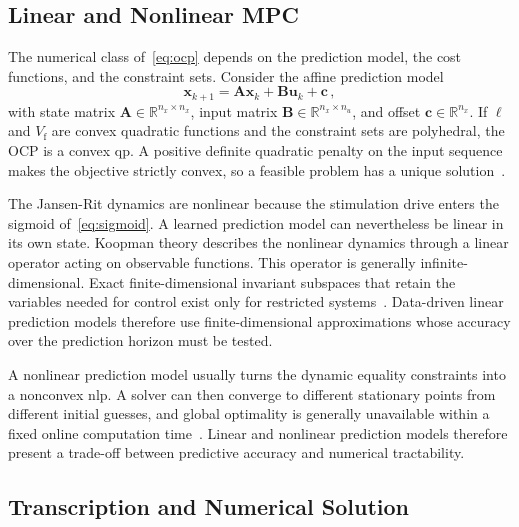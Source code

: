 \subsection{Linear and Nonlinear MPC}
\label{sec:linear_nonlinear_mpc}

The numerical class of~\eqref{eq:ocp} depends on the prediction model, the cost functions, %
and the constraint sets. Consider the affine prediction model
%
\begin{equation*}
    \mathbf{x}_{k+1} = \mathbf{A}\mathbf{x}_k + \mathbf{B}\mathbf{u}_k + \mathbf{c} \,,
\end{equation*}
%
with state matrix $\mathbf{A} \in \mathbb{R}^{n_x \times n_x}$, input matrix
$\mathbf{B} \in \mathbb{R}^{n_x \times n_u}$, and offset
$\mathbf{c} \in \mathbb{R}^{n_x}$. If $\ell$ and $V_\mathrm{f}$ are convex quadratic
functions and the constraint sets are polyhedral, the OCP is a convex \ac{qp}. A positive %
definite quadratic penalty on the input sequence makes the objective strictly convex, so a
feasible problem has a unique solution~\cite{Rawlings2017}. %

The Jansen-Rit dynamics are nonlinear because the stimulation drive enters the sigmoid
of~\eqref{eq:sigmoid}. A learned prediction model can nevertheless be linear in its own state.
Koopman theory describes the nonlinear dynamics through a linear operator acting on
observable functions. This operator is generally infinite-dimensional. Exact
finite-dimensional invariant subspaces that retain the variables needed for control exist
only for restricted systems~\cite{Rowley2009,Brunton2016}. Data-driven linear prediction %
models therefore use finite-dimensional approximations whose accuracy over the prediction
horizon must be tested.

A nonlinear prediction model usually turns the dynamic equality constraints into a nonconvex
\ac{nlp}. A solver can then converge to different stationary points from different
initial guesses, and global optimality is generally unavailable within a fixed online
computation time~\cite{Findeisen2002}. Linear and nonlinear prediction models therefore %
present a trade-off between predictive accuracy and numerical tractability.

\subsection{Transcription and Numerical Solution}
\label{sec:transcription}

